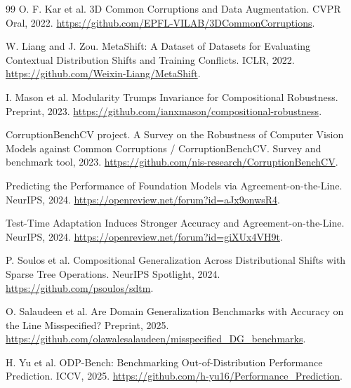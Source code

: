 \documentclass[11pt,a4paper]{article}
\begin{document}
\begin{thebibliography}{99}
O. F. Kar et al.
\newblock 3D Common Corruptions and Data Augmentation.
\newblock CVPR Oral, 2022.
\newblock \url{https://github.com/EPFL-VILAB/3DCommonCorruptions}.

W. Liang and J. Zou.
\newblock MetaShift: A Dataset of Datasets for Evaluating Contextual Distribution Shifts and Training Conflicts.
\newblock ICLR, 2022.
\newblock \url{https://github.com/Weixin-Liang/MetaShift}.

I. Mason et al.
\newblock Modularity Trumps Invariance for Compositional Robustness.
\newblock Preprint, 2023.
\newblock \url{https://github.com/ianxmason/compositional-robustness}.

CorruptionBenchCV project.
\newblock A Survey on the Robustness of Computer Vision Models against Common Corruptions / CorruptionBenchCV.
\newblock Survey and benchmark tool, 2023.
\newblock \url{https://github.com/nis-research/CorruptionBenchCV}.

\newblock Predicting the Performance of Foundation Models via Agreement-on-the-Line.
\newblock NeurIPS, 2024.
\newblock \url{https://openreview.net/forum?id=aJx9onwsR4}.

\newblock Test-Time Adaptation Induces Stronger Accuracy and Agreement-on-the-Line.
\newblock NeurIPS, 2024.
\newblock \url{https://openreview.net/forum?id=giXUx4VH9t}.

P. Soulos et al.
\newblock Compositional Generalization Across Distributional Shifts with Sparse Tree Operations.
\newblock NeurIPS Spotlight, 2024.
\newblock \url{https://github.com/psoulos/sdtm}.

O. Salaudeen et al.
\newblock Are Domain Generalization Benchmarks with Accuracy on the Line Misspecified?
\newblock Preprint, 2025.
\newblock \url{https://github.com/olawalesalaudeen/misspecified_DG_benchmarks}.

H. Yu et al.
\newblock ODP-Bench: Benchmarking Out-of-Distribution Performance Prediction.
\newblock ICCV, 2025.
\newblock \url{https://github.com/h-yu16/Performance_Prediction}.

\end{thebibliography}
\end{document}
